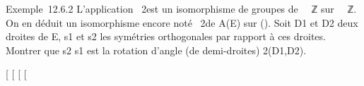 Exemple~12.6.2 L'application \theta\mapsto~2\theta est un
isomorphisme de groupes de ~\diagup\pi~ℤ sur ~\pi~ℤ. On en déduit un isomorphisme
encore noté \theta\mapsto~2\theta de A(E) sur
\tildeA(). Soit D1 et D2 deux
droites de E, s1 et s2 les symétries orthogonales
par rapport à ces droites. Montrer que s2 \cdot s1 est
la rotation d'angle (de demi-droites)
2\widehat(D1,D2).

{[}
{[}
{[}
{[}
